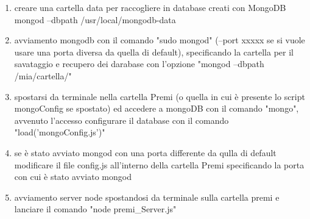 \documentclass[a4paper,12pt]{article}
\begin{document}
\begin{enumerate}
\item creare una cartella data per raccogliere in database creati con MongoDB
mongod --dbpath /usr/local/mongodb-data
\item avviamento mongodb con il comando "sudo mongod" (--port xxxxx se si vuole usare una porta diversa da quella di default), specificando la cartella per il savataggio e recupero dei darabase con l'opzione "mongod --dbpath /mia/cartella/"
\item  spostarsi da terminale nella cartella Premi (o quella in cui \`{e} presente lo script mongoConfig se spostato) ed accedere a mongoDB con il comando "mongo", avvenuto l'accesso configurare il database con il comando "load('mongoConfig.js')"
\item se \`{e} stato avviato mongod con una porta differente da qulla di default modificare il file config.js all'interno della cartella Premi specificando la porta con cui \`{e} stato avviato mongod
\item  avviamento server node spostandosi da terminale sulla cartella premi e lanciare il comando "node premi\_Server.js" %

\end{enumerate}

	
\end{document}
